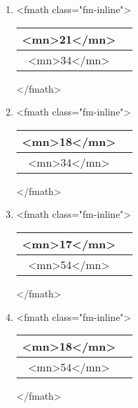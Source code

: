 \documentclass{article}
\begin{document}
\begin{enumerate}[label=(\alph*)]
\item  <fmath class="fm-inline">\begin{tabular}{|c|c|}
\hline
<mn>21</mn> \\
\hline
<mn>34</mn> \\
\hline
\end{tabular}
</fmath>
\item  <fmath class="fm-inline">\begin{tabular}{|c|c|}
\hline
<mn>18</mn> \\
\hline
<mn>34</mn> \\
\hline
\end{tabular}
</fmath>
\item  <fmath class="fm-inline">\begin{tabular}{|c|c|}
\hline
<mn>17</mn> \\
\hline
<mn>54</mn> \\
\hline
\end{tabular}
</fmath>
\item  <fmath class="fm-inline">\begin{tabular}{|c|c|}
\hline
<mn>18</mn> \\
\hline
<mn>54</mn> \\
\hline
\end{tabular}
</fmath>
\end{enumerate}
\newpage
\end{document}
